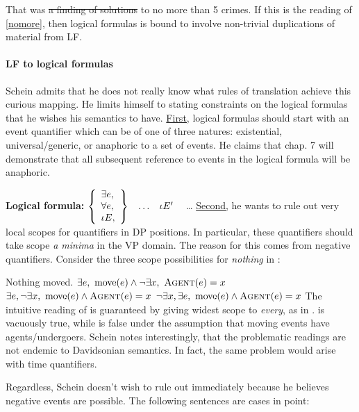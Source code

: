 \ex
That was \sout{a finding of solutions} to no more than 5 crimes.
\xe
%
If this is the reading of \cref{nomore}, then logical formulas is bound to involve non-trivial duplications of material from LF. 

\paragraph{LF to logical formulas} Schein admits that he does not really know what rules of translation achieve this curious mapping. He limits himself to stating constraints on the logical formulas that he wishes his semantics to have. \underline{First,} logical formulas should start with an event quantifier which can be of one of three natures: existential, universal/generic, or anaphoric to a set of events.
He claims that chap. 7 will demonstrate that all subsequent reference to events in the logical formula will be anaphoric.

\ex
\textbf{Logical formula:}
$
\left\lbrace 
\begin{array}{l}
\exists e,\\
\forall e,\\
\iota E,\\
\end{array}
\right\rbrace
\hspace{2ex}
\ldots
\hspace{2ex}
\iota E'
\hspace{2ex}
$
\ldots
\hspace{2ex}
\xe
%
\underline{Second,} he wants to rule out very local scopes for quantifiers in DP positions. In particular, these quantifiers should take scope \emph{a minima} in the VP domain. The reason for this comes from negative quantifiers. Consider the three scope possibilities for \emph{nothing} in \cnextx:

\pex
 Nothing moved. \label{move}
\a   
$\exists e,\ \text{move}(e) \wedge\neg\exists x,\ \textsc{Agent}(e) = x$
\a
$\exists e, \neg\exists x,\ \text{move}(e) \wedge\textsc{Agent}(e) = x$
\a 
$\neg\exists x,\exists e,\ \text{move}(e) \wedge\textsc{Agent}(e) = x$
\xe
%
The intuitive reading of \clastx[a] is guaranteed by giving widest scope to \emph{every}, as in \cnextx[c]. \cnextx[b] is vacuously true, while \cnextx[a] is false under the assumption that moving events have agents/undergoers. Schein notes interestingly, that the problematic readings are not endemic to Davidsonian semantics. In fact, the same problem would arise with time quantifiers.

Regardless, Schein doesn't wish to rule out \clastx[b] immediately because he believes negative events are possible. The following sentences are cases in point:


